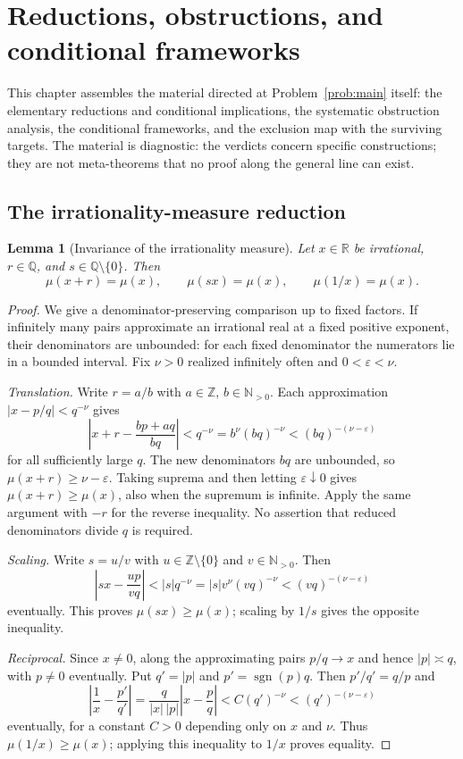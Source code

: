 \documentclass[11pt]{amsart}
\newtheorem{lemma}[theorem]{Lemma}
\theoremstyle{definition}
\theoremstyle{remark}
\numberwithin{equation}{section}
\newcommand{\Q}{\mathbb{Q}}
\newcommand{\R}{\mathbb{R}}
\newcommand{\Z}{\mathbb{Z}}
\newcommand{\N}{\mathbb{N}}
\newcommand{\irr}{\mu}
\begin{document}
\section{Reductions, obstructions, and conditional frameworks}\label{sec:new}

This chapter assembles the material directed at
Problem~\ref{prob:main} itself: the elementary reductions and
conditional implications, the systematic obstruction analysis, the
conditional frameworks, and the exclusion map with the surviving
targets. The material is diagnostic: the verdicts concern specific
constructions; they are not meta-theorems that no proof along the
general line can exist.

\subsection{The irrationality-measure reduction}

\begin{lemma}[Invariance of the irrationality measure]\label{lem:invariance}
Let $x\in\R$ be irrational, $r\in\Q$, and $s\in\Q\setminus\{0\}$. Then
\[
\irr(x+r)=\irr(x),\qquad \irr(sx)=\irr(x),\qquad \irr(1/x)=\irr(x).
\]
\end{lemma}

\begin{proof}
We give a denominator-preserving comparison up to fixed factors. If infinitely many pairs approximate an irrational real at a fixed positive exponent, their denominators are unbounded: for each fixed denominator the numerators lie in a bounded interval. Fix $\nu>0$ realized infinitely often and $0<\varepsilon<\nu$.

\emph{Translation.} Write $r=a/b$ with $a\in\Z$, $b\in\N_{>0}$. Each approximation $|x-p/q|<q^{-\nu}$ gives
\[
\left|x+r-\frac{bp+aq}{bq}\right|<q^{-\nu}
=b^\nu(bq)^{-\nu}<(bq)^{-(\nu-\varepsilon)}
\]
for all sufficiently large $q$. The new denominators $bq$ are unbounded, so $\irr(x+r)\ge\nu-\varepsilon$. Taking suprema and then letting $\varepsilon\downarrow0$ gives $\irr(x+r)\ge\irr(x)$, also when the supremum is infinite. Apply the same argument with $-r$ for the reverse inequality. No assertion that reduced denominators divide $q$ is required.

\emph{Scaling.} Write $s=u/v$ with $u\in\Z\setminus\{0\}$ and $v\in\N_{>0}$. Then
\[
\left|sx-\frac{up}{vq}\right|<|s|q^{-\nu}
=|s|v^\nu(vq)^{-\nu}<(vq)^{-(\nu-\varepsilon)}
\]
eventually. This proves $\irr(sx)\ge\irr(x)$; scaling by $1/s$ gives the opposite inequality.

\emph{Reciprocal.} Since $x\ne0$, along the approximating pairs $p/q\to x$ and hence $|p|\asymp q$, with $p\ne0$ eventually. Put $q'=|p|$ and $p'=\operatorname{sgn}(p)q$. Then $p'/q'=q/p$ and
\[
\left|\frac1x-\frac{p'}{q'}\right|
=\frac{q}{|x|\,|p|}\left|x-\frac pq\right|
<C(q')^{-\nu}<(q')^{-(\nu-\varepsilon)}
\]
eventually, for a constant $C>0$ depending only on $x$ and $\nu$. Thus $\irr(1/x)\ge\irr(x)$; applying this inequality to $1/x$ proves equality.
\end{proof}
\end{document}
